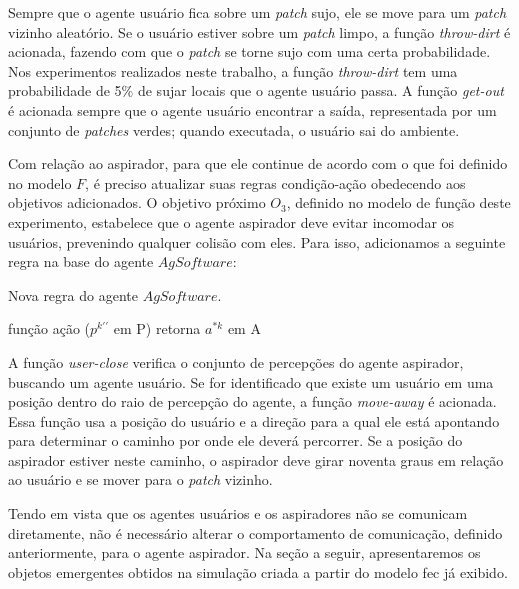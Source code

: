 Sempre que o agente usuário fica sobre um \textit{patch} sujo, ele se move para um \textit{patch} vizinho aleatório. Se o usuário estiver sobre um \textit{patch} limpo, a função \textit{throw-dirt} é acionada, fazendo com que o \textit{patch} se torne sujo com uma certa probabilidade. Nos experimentos realizados neste trabalho, a função \textit{throw-dirt} tem uma probabilidade de 5\% de sujar locais que o agente usuário passa. A função \textit{get-out} é acionada sempre que o agente usuário encontrar a saída, representada por um conjunto de \textit{patches} verdes; quando executada, o usuário sai do ambiente. 

Com relação ao aspirador, para que ele continue de acordo com o que foi definido no modelo $F$, é preciso atualizar suas regras condição-ação obedecendo aos objetivos adicionados. O objetivo próximo $O_3$, definido no modelo de função deste experimento, estabelece que o agente aspirador deve evitar incomodar os usuários, prevenindo qualquer colisão com eles. Para isso, adicionamos a seguinte regra na base do agente $AgSoftware$:

\begin{algorithm}[h!]
    \caption{\label{alg:exp3-behaviour-asp} Nova regra do agente $AgSoftware$.}
    função ação ($p^{k\prime\prime}$ em P) retorna $a^{*k}$ em A\\
\end{algorithm}

A função \textit{user-close} verifica o conjunto de percepções do agente aspirador, buscando um agente usuário. Se for identificado que existe um usuário em uma posição dentro do raio de percepção do agente, a função \textit{move-away} é acionada. Essa função usa a posição do usuário e a direção para a qual ele está apontando para determinar o caminho por onde ele deverá percorrer. Se a posição do aspirador estiver neste caminho, o aspirador deve girar noventa graus em relação ao usuário e se mover para o \textit{patch} vizinho.

Tendo em vista que os agentes usuários e os aspiradores não se comunicam diretamente, não é necessário alterar o comportamento de comunicação, definido anteriormente, para o agente aspirador. Na seção a seguir, apresentaremos os objetos emergentes obtidos na simulação criada a partir do modelo \acrshort{fec} já exibido. 

